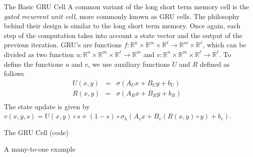 \documentclass[10pt]{beamer}
\newcommand{\R}{\mathbb{R}}
\begin{document}
\begin{frame}{The Basic GRU Cell}
  A common variant of the long short term memory cell is the {\em gated recurrent unit cell}, more commonly known as GRU cells.  The philosophy behind their design is similar to the long short term memory. Once again, each step of the computation takes into account a state vector and the output of the previous iteration. GRU's are functions  $f:\R^n\times \R^m\times \R^{\ell}\to \R^m\times \R^{\ell}$,  which can be divided as two function $u:\R^{n}\times\R^m\times \R^{\ell}\to \R^m$ and $v:\R^n\times \R^m\times\R^{\ell}\to \R^{\ell}$. To define the functione $u$ and $v$, we use auxiliary functions $U$ and  $R$ defined as follows
  \begin{eqnarray*}
    U(x, y) &=& \sigma(A_Ux + B_Uy + b_U)\\
    R(x, y) &=& \sigma(A_Rx + B_Ry + b_R)\\
  \end{eqnarray*}
  The state update is given by $v(x, y, s) = U(x, y)\circ s + (1-s)\circ \sigma_h(A_v x + B_v(R(x, y)\circ y) + b_v)$.
\end{frame}


\begin{frame}{The GRU Cell (code)}
\lstI
\end{frame}






\begin{frame}{A many-to-one example}
\end{frame}
\end{document}
